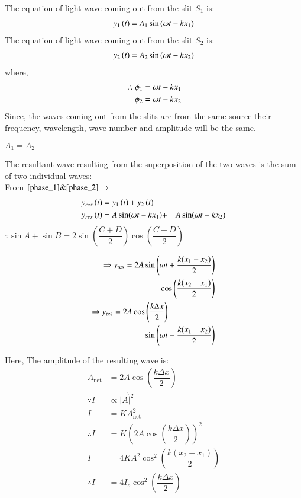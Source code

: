\documentclass[journal,12pt,twocolumn]{IEEEtran}
\theoremstyle{remark}
\begin{document}
The equation of light wave coming out from the slit $S_1$ is:
\begin{align}
    y_1\left(t\right) = A_1\sin{(\omega t - kx_1)} \label{phase_1}
\end{align}
The equation of light wave coming out from the slit $S_2$ is:
\begin{align}
     y_2\left(t\right) = A_2\sin{(\omega t - kx_2)} \label{phase_2}
\end{align}
\vspace{-0.5cm}
where,
\begin{align}
 \therefore \phi_1 &= \omega t - kx_1 \\
\hspace*{0.4cm} \phi_2 &= \omega t - kx_2 
\end{align}
\hspace*{0.8cm} Since, the waves coming out from the slits are from the same source their frequency, wavelength, wave number and amplitude will be the same. 
\begin{center}
    $A_1 = A_2$ \\
\end{center} 
The resultant wave resulting from the superposition of the two waves is the sum of two individual waves: \\
From $\eqref{phase_1} \& \eqref{phase_2} \Rightarrow$
\begin{align}
y_{res}\left(t\right) &= y_1\left(t\right) + y_2\left(t\right)  \\
y_{res}\left(t\right) &= A\sin({\omega t - kx_1})  + &A\sin({ \omega t - kx_2}) \nonumber 
\end{align}
 $ \because \sin{A} + \sin{B} = 2\sin\left(\dfrac{C+D}{2}\right) \cos\left(\dfrac{C-D}{2}\right) $ 
 
\begin{align}
\Rightarrow y_\text{res} =  2A\sin\left( \omega t+\dfrac{k(x_1+x_2)}{2} \right) \nonumber \\
\quad\cos\left(\dfrac{k(x_2 - x_1)}{2}\right) \\
 \Rightarrow y_\text{res} =  2A\cos\left(\dfrac{k\Delta x}{2}\right) \nonumber \hspace*{2cm} \\ \quad \sin\left(\omega t - \dfrac{k(x_1+x_2)}{2} \right) 
 \end{align}

Here,
The amplitude of the resulting wave is: 
\begin{align}
A_\text{net} &= 2A\cos\left(\dfrac{k\Delta x}{2}\right)  \\ 
\because I &\propto \lvert\overrightarrow{A}\rvert^2  \nonumber \\
I &= KA^2_\text{net} \\
\therefore I &= K\left(2A\cos\left(\dfrac{k\Delta x}{2}\right)\right)^2 \nonumber\\
I &= 4KA^2\cos^2\left(\dfrac{k(x_2 - x_1) }{2}\right) \nonumber \\
\therefore I &= 4I_o\cos^2\left(\dfrac{k\Delta x}{2}\right) 
\end{align}
\end{document}
